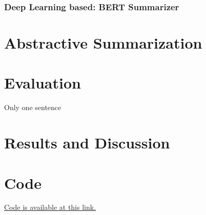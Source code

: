 \documentclass[fleqn,10pt]{SelfArx} %
\begin{document}
\subsubsection{Deep Learning based: BERT Summarizer}
\section{Abstractive Summarization}
\section{Evaluation}
Only one sentence
\section{Results and Discussion}
\section*{Code}
\href{https://github.com/RCrvro/Text-Summarization-Project}{Code is available at this link.}



\end{document}
